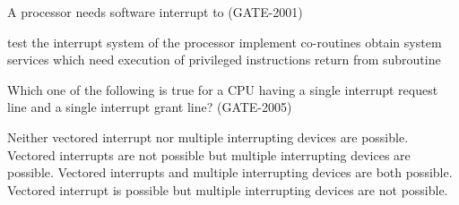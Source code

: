 \begin{questyle}
  \question  A processor needs software interrupt to  (GATE-2001)

  \begin{choices}
    \choice         test the interrupt system of the processor
    \choice         implement co-routines
    \CorrectChoice  obtain system services which need execution of privileged instructions
    \choice         return from subroutine
  \end{choices}
\end{questyle}


\begin{questyle}
  \question  Which one of the following is true for a CPU having a single interrupt request
  line and a single interrupt grant line?  (GATE-2005)

  \begin{choices}
    \choice         Neither vectored interrupt nor multiple interrupting devices are possible.
    \choice         Vectored interrupts are not possible but multiple interrupting devices are possible.
    \CorrectChoice  Vectored interrupts and multiple interrupting devices are both possible.
    \choice         Vectored interrupt is possible but multiple in­terrupting devices are not possible.
  \end{choices}
\end{questyle}

\begin{comment}


\begin{questyle}
  \question  zzz  (GATE-zzz)

  \begin{choices}
    \choice         zzz
    \choice         zzz
    \choice         zzz
    \choice         zzz
\CorrectChoice
  \end{choices}
\end{questyle}

\begin{questyle}
  \question  zzz  (GATE-zzz)

  \begin{choices}
    \choice         zzz
    \choice         zzz
    \choice         zzz
    \choice         zzz
\CorrectChoice
  \end{choices}
\end{questyle}

\begin{questyle}
  \question  zzz  (GATE-zzz)

  \begin{choices}
    \choice         zzz
    \choice         zzz
    \choice         zzz
    \choice         zzz
\CorrectChoice
  \end{choices}
\end{questyle}
\end{comment}


